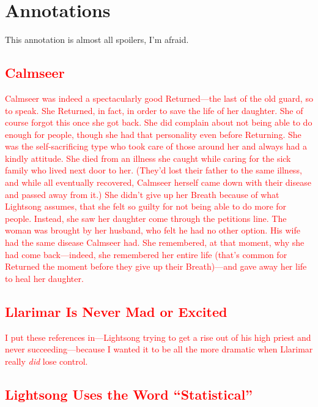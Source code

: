 \section*{Annotations}

This annotation is almost all spoilers, I’m afraid.

\textcolor{red}{
\subsection*{Calmseer}
}
\textcolor{red}{
Calmseer was indeed a spectacularly good Returned—the last of the old guard, so to speak. She Returned, in fact, in order to save the life of her daughter. She of course forgot this once she got back.
}
\textcolor{red}{
She did complain about not being able to do enough for people, though she had that personality even before Returning. She was the self-sacrificing type who took care of those around her and always had a kindly attitude. She died from an illness she caught while caring for the sick family who lived next door to her. (They’d lost their father to the same illness, and while all eventually recovered, Calmseer herself came down with their disease and passed away from it.)
}
\textcolor{red}{
She didn’t give up her Breath because of what Lightsong assumes, that she felt so guilty for not being able to do more for people. Instead, she saw her daughter come through the petitions line. The woman was brought by her husband, who felt he had no other option. His wife had the same disease Calmseer had. She remembered, at that moment, why she had come back—indeed, she remembered her entire life (that’s common for Returned the moment before they give up their Breath)—and gave away her life to heal her daughter.
}
\textcolor{red}{
\subsection*{Llarimar Is Never Mad or Excited}
}
\textcolor{red}{
I put these references in—Lightsong trying to get a rise out of his high priest and never succeeding—because I wanted it to be all the more dramatic when Llarimar really \textit{did} lose control.
}
\textcolor{red}{
\subsection*{Lightsong Uses the Word “Statistical”}
}
